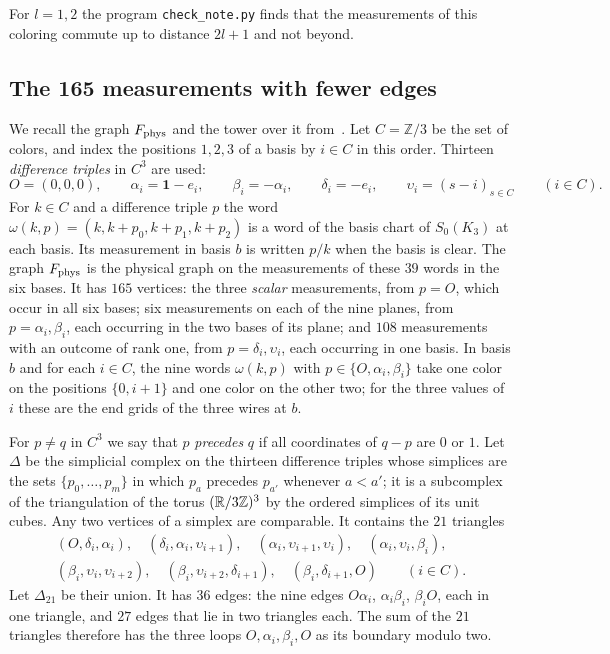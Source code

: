 For $l=1,2$ the program \texttt{check\_note.py} finds that the measurements of this coloring commute up to distance $2l+1$ and not beyond.

\subsection{The 165 measurements with fewer edges}\label{sec:165}

We recall the graph $F_{\rm phys}$ and the tower over it from~\cite[Section~6.2 and Appendix~E]{Z}. Let $C=\mathbb Z/3$ be the set of colors, and index the positions $1,2,3$ of a basis by $i\in C$ in this order. Thirteen \emph{difference triples} in $C^3$ are used:
\[
 O=(0,0,0),\qquad\alpha_i=\mathbf1-e_i,\qquad\beta_i=-\alpha_i,\qquad\delta_i=-e_i,\qquad\upsilon_i=(s-i)_{s\in C}\qquad(i\in C).
\]
For $k\in C$ and a difference triple $p$ the word $\omega(k,p)=(k,k+p_0,k+p_1,k+p_2)$ is a word of the basis chart of $S_0(K_3)$ at each basis. Its measurement in basis $b$ is written $p/k$ when the basis is clear. The graph $F_{\rm phys}$ is the physical graph on the measurements of these $39$ words in the six bases. It has $165$ vertices: the three \emph{scalar} measurements, from $p=O$, which occur in all six bases; six measurements on each of the nine planes, from $p=\alpha_i,\beta_i$, each occurring in the two bases of its plane; and $108$ measurements with an outcome of rank one, from $p=\delta_i,\upsilon_i$, each occurring in one basis. In basis $b$ and for each $i\in C$, the nine words $\omega(k,p)$ with $p\in\{O,\alpha_i,\beta_i\}$ take one color on the positions $\{0,i+1\}$ and one color on the other two; for the three values of $i$ these are the end grids of the three wires at $b$.

For $p\ne q$ in $C^3$ we say that $p$ \emph{precedes} $q$ if all coordinates of $q-p$ are $0$ or $1$. Let $\Delta$ be the simplicial complex on the thirteen difference triples whose simplices are the sets $\{p_0,\ldots,p_m\}$ in which $p_a$ precedes $p_{a'}$ whenever $a<a'$; it is a subcomplex of the triangulation of the torus $(\mathbb R/3\mathbb Z)^3$ by the ordered simplices of its unit cubes. Any two vertices of a simplex are comparable. It contains the $21$ triangles
\begin{equation}\label{eq:triangles}
\begin{gathered}
 (O,\delta_i,\alpha_i),\quad(\delta_i,\alpha_i,\upsilon_{i+1}),\quad(\alpha_i,\upsilon_{i+1},\upsilon_i),\quad(\alpha_i,\upsilon_i,\beta_i),\\
 (\beta_i,\upsilon_i,\upsilon_{i+2}),\quad(\beta_i,\upsilon_{i+2},\delta_{i+1}),\quad(\beta_i,\delta_{i+1},O)\qquad(i\in C).
\end{gathered}
\end{equation}
Let $\Delta_{21}$ be their union. It has $36$ edges: the nine edges $O\alpha_i$, $\alpha_i\beta_i$, $\beta_iO$, each in one triangle, and $27$ edges that lie in two triangles each. The sum of the $21$ triangles therefore has the three loops $O,\alpha_i,\beta_i,O$ as its boundary modulo two.

